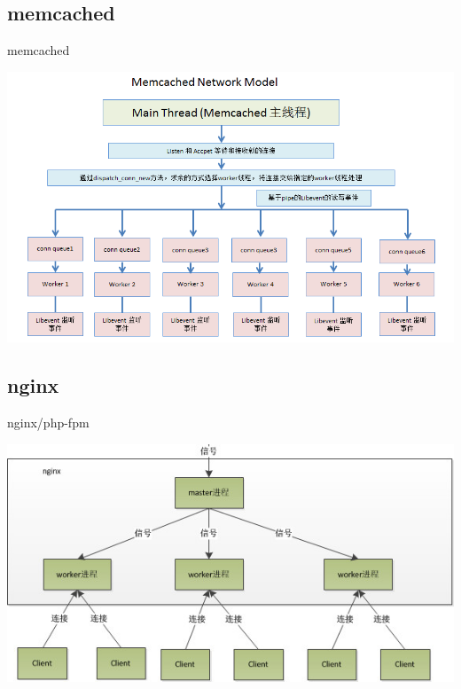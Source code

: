 \documentclass[UTF8]{beamer}
\begin{document}
\subsection{memcached}
\begin{frame}[fragile]{memcached}
  \centerline{\includegraphics[width=\textwidth]{img/memcached-model.jpg}}
\end{frame}
\subsection{nginx}
\begin{frame}[fragile]{nginx/php-fpm}
  \centerline{\includegraphics[width=\textwidth]{img/nginx-model.png}}
\end{frame}
\end{document}
